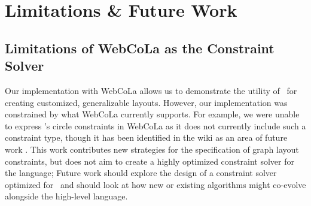 \section{Limitations \& Future Work}





\subsection{Limitations of WebCoLa as the Constraint Solver}




Our implementation with WebCoLa allows us to demonstrate the utility of
\projectname~for creating customized, generalizable layouts. However, our
implementation was constrained by what WebCoLa currently supports. For
example, we were unable to express \projectname's circle constraints in
WebCoLa as it does not currently include such a constraint type, though it
has been identified in the wiki as an area of future work
. This work contributes new strategies for the
specification of graph layout constraints, but does not aim to create a
highly optimized constraint solver for the language; Future work should
explore the design of a constraint solver optimized for \projectname~and
should look at how new or existing algorithms might co-evolve alongside the
high-level language.

